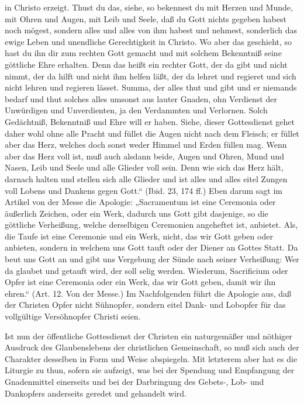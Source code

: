 in Christo erzeigt. Thust du das, siehe, so bekennest du mit Herzen und Munde, mit Ohren und Augen, mit Leib und Seele, daß du Gott nichts gegeben habest noch mögest, sondern alles und alles von ihm habest und nehmest, sonderlich das ewige Leben und unendliche Gerechtigkeit in Christo. Wo aber das geschieht, so hast du ihn dir zum rechten Gott gemacht und mit solchem Bekenntniß seine göttliche Ehre erhalten. Denn das heißt ein rechter Gott, der da gibt und nicht nimmt, der da hilft und nicht ihm helfen läßt, der da lehret und regieret und sich nicht lehren und regieren lässet. Summa, der alles thut und gibt und er niemands bedarf und thut solches alles umsonst aus lauter Gnaden, ohn Verdienst der Unwürdigen und Unverdienten, ja den Verdammten und Verlornen. Solch Gedächtniß, Bekenntniß und Ehre will er haben. Siehe, dieser Gottesdienst gehet daher wohl ohne alle Pracht und füllet die Augen nicht nach dem Fleisch; er füllet aber das Herz, welches doch sonst weder Himmel und Erden füllen mag. Wenn aber das Herz voll ist, muß auch alsdann beide, Augen und Ohren, Mund und Nasen, Leib und Seele und alle Glieder voll sein. Denn wie sich das Herz hält, darnach halten und stellen sich alle Glieder und ist alles und alles eitel Zungen voll Lobens und Dankens gegen Gott.“ (Ibid. 23, 174 ff.) Eben darum sagt im Artikel von der Messe die Apologie: „Sacramentum ist eine Ceremonia oder äußerlich Zeichen, oder ein Werk, dadurch uns Gott gibt dasjenige, so die göttliche Verheißung, welche derselbigen Ceremonien angeheftet ist, anbietet. Als, die Taufe ist eine Ceremonie und ein Werk, nicht, das wir Gott geben oder anbieten, sondern in welchem uns Gott tauft oder der Diener an Gottes Statt. Da beut uns Gott an und gibt uns Vergebung der Sünde nach seiner Verheißung: Wer da glaubet und getauft wird, der soll selig werden. Wiederum, Sacrificium oder Opfer ist eine Ceremonia oder ein Werk, das wir Gott geben, damit wir ihn ehren.“ (Art. 12. Von der Messe.) Im Nachfolgenden führt die Apologie aus, daß der Christen Opfer nicht Sühnopfer, sondern eitel Dank- und Lobopfer für das vollgültige Versöhnopfer Christi seien.

Ist nun der öffentliche Gottesdienst der Christen ein naturgemäßer und nöthiger Ausdruck des Glaubenslebens der christlichen Gemeinschaft, so muß sich auch der Charakter desselben in Form und Weise abspiegeln. Mit letzterem aber hat es die Liturgie zu thun, sofern sie aufzeigt, was bei der Spendung und Empfangung der Gnadenmittel einerseits und bei der Darbringung des Gebets-, Lob- und Dankopfers anderseits geredet und gehandelt wird.


